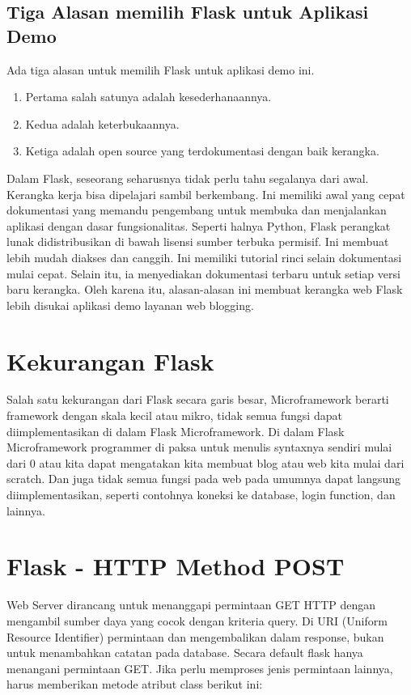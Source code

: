 \subsection{Tiga Alasan memilih Flask untuk Aplikasi Demo}
Ada tiga alasan untuk memilih Flask untuk aplikasi demo ini. 
\begin{enumerate}
\item Pertama salah satunya adalah kesederhanaannya. 
\item Kedua adalah keterbukaannya.
\item Ketiga adalah open source yang terdokumentasi dengan baik kerangka.
\end{enumerate}
Dalam Flask, seseorang seharusnya tidak perlu tahu segalanya dari awal. Kerangka kerja bisa dipelajari sambil berkembang. Ini memiliki awal yang cepat dokumentasi yang memandu pengembang untuk membuka dan menjalankan aplikasi dengan dasar fungsionalitas. Seperti halnya Python, Flask perangkat lunak didistribusikan di bawah lisensi sumber terbuka permisif. Ini membuat lebih mudah diakses dan canggih.  Ini memiliki tutorial rinci selain dokumentasi mulai cepat. Selain itu, ia menyediakan dokumentasi terbaru untuk setiap versi baru kerangka. Oleh karena itu, alasan-alasan ini membuat kerangka web Flask lebih disukai aplikasi demo layanan web blogging\cite{alemu2014rest}.

\section{Kekurangan Flask}
Salah satu kekurangan dari Flask secara garis besar, Microframework berarti framework dengan skala kecil atau mikro, tidak semua fungsi dapat diimplementasikan di dalam Flask Microframework.  Di dalam Flask Microframework programmer di paksa untuk menulis syntaxnya sendiri mulai dari 0 atau kita dapat mengatakan kita membuat blog atau web kita mulai dari scratch. Dan juga tidak semua fungsi pada web pada umumnya dapat langsung diimplementasikan, seperti contohnya koneksi ke database, login function, dan lainnya\cite{ronacher2010flask}.

\section{Flask - HTTP Method POST}
Web Server dirancang untuk menanggapi permintaan GET HTTP dengan mengambil sumber daya yang cocok dengan kriteria query. Di URI (Uniform Resource Identifier) permintaan dan mengembalikan dalam response, bukan untuk menambahkan catatan pada database\cite{rodriguez2008restful}. Secara default flask hanya menangani permintaan GET. Jika perlu memproses jenis permintaan lainnya, harus memberikan metode atribut class berikut ini:

